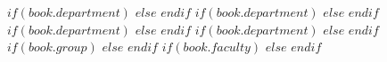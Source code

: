 {} %
\examiner{} %
{} %
\author{$author$} %
\addresses{} %

\subject{} %
\keywords{} %
$if(book.department)$
$else$\city{}
$endif$
$if(book.department)$
$else$\dateyear{}
$endif$
$if(book.department)$
$else$\university{}
$endif$
$if(book.department)$
$else$\department{}
$endif$
$if(book.group)$
$else$\group{}
$endif$
$if(book.faculty)$
$else$
\faculty{}$endif$

\setcounter{tocdepth}{$if(toc-depth)$$toc-depth$$else$3$endif$} %
